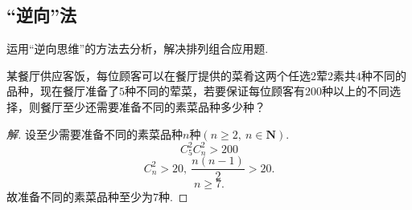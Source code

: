 \documentclass[marginline,noindent,answers,adobefonts]{BHCexam}
\begin{document}
\subsection{“逆向”法   }
 运用“逆向思维”的方法去分析，解决排列组合应用题.\par
\begin{example}
某餐厅供应客饭，每位顾客可以在餐厅提供的菜肴这两个任选$ 2 $荤$ 2 $素共$ 4 $种不同的品种，现在餐厅准备了$ 5 $种不同的荤菜，若要保证每位顾客有$ 200 $种以上的不同选择，则餐厅至少还需要准备不同的素菜品种多少种？
\end{example}
\begin{proof}[解]
设至少需要准备不同的素菜品种$ n $种$(n\ge 2,~n\in \mathbf{N})$.
\[C_5^2C_n^2>200\]
\[C_n^2>20,~\dfrac{n(n-1)}{2}>20.\]
\[n\ge 7.\]
故准备不同的素菜品种至少为$ 7 $种.
\end{proof}
\end{document}
